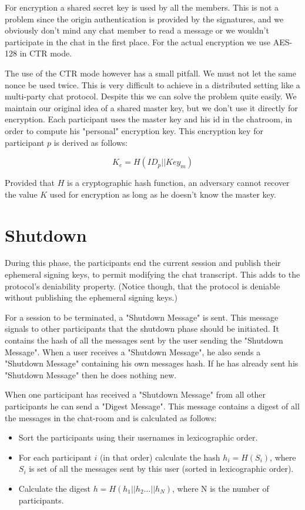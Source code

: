 \documentclass[12pt,titlepage,a4paper]{article}
\begin{document}
{For encryption a shared secret key is used by all the members. This is not a
problem since the origin authentication is provided by the signatures, and
we obviously don't mind any chat member to read a message or we wouldn't
participate in the chat in the first place. For the actual encryption we
use AES-128 in CTR mode.

The use of the CTR mode however has a small pitfall. We must not let the same
nonce be used twice. This is very difficult to achieve in a distributed setting
like a multi-party chat protocol. Despite this we can solve the problem quite
easily. We maintain our original idea of a shared master key, but we don't use
it directly for encryption. Each participant uses the master key and his id in
the chatroom, in order to compute his "personal" encryption key. This encryption
key for participant $p$ is derived as follows:

\[
    K_e = H(ID_p || Key_m)
\]

Provided that $H$ is a cryptographic hash function, an adversary cannot recover
the value $K$ used for encryption as long as he doesn't know the master key.
}
\section{Shutdown}

During this phase, the participants end the current session and publish their
ephemeral signing keys, to permit modifying the chat transcript. This adds to
the protocol's deniability property. (Notice though, that the protocol is
deniable without publishing the ephemeral signing keys.)

For a session to be terminated, a "Shutdown Message" is sent.
This message signals to other participants that the shutdown phase should be initiated.
It contains the  hash of all the messages sent by the user sending the "Shutdown Message".
When a user receives a "Shutdown Message", he also sends a "Shutdown Message" containing his own messages hash.
If he has already sent his "Shutdown Message" then he does nothing new.

When one participant has received a "Shutdown Message" from all other participants he can send a "Digest Message".
This message contains a digest of all the messages in the chat-room and is calculated as follows:
\begin{itemize}
  \item[] Sort the participants using their usernames in lexicographic order.
  \item[] For each participant $i$ (in that order) calculate the hash $h_i = H(S_i)$, where $S_i$ is set of all the messages sent by this user (sorted in lexicographic order).
  \item[] Calculate the digest $h = H(h_1 || h_2 \dots || h_N)$, where N is the number of participants.
\end{itemize}
\end{document}
